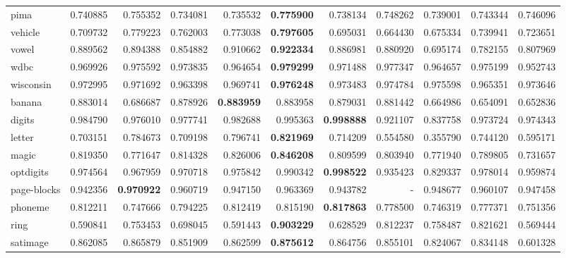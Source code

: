 \begin{tabular}{lrrrrrrrrrr}
pima            &   0.740885 &  0.755352 &  0.734081 &  0.735532 &  \textbf{0.775900} &  0.738134 &  0.748262 &  0.739001 &  0.743344 &  0.746096 \\
vehicle         &   0.709732 &  0.779223 &  0.762003 &  0.773038 &  \textbf{0.797605} &  0.695031 &  0.664430 &  0.675334 &  0.739941 &  0.723651 \\
vowel           &   0.889562 &  0.894388 &  0.854882 &  0.910662 &  \textbf{0.922334} &  0.886981 &  0.880920 &  0.695174 &  0.782155 &  0.807969 \\
wdbc            &   0.969926 &  0.975592 &  0.973835 &  0.964654 &  \textbf{0.979299} &  0.971488 &  0.977347 &  0.964657 &  0.975199 &  0.952743 \\
wisconsin       &   0.972995 &  0.971692 &  0.963398 &  0.969741 &  \textbf{0.976248} &  0.973483 &  0.974784 &  0.975598 &  0.965351 &  0.973646 \\
banana          &   0.883014 &  0.686687 &  0.878926 &  \textbf{0.883959} &  0.883958 &  0.879031 &  0.881442 &  0.664986 &  0.654091 &  0.652836 \\
digits          &   0.984790 &  0.976010 &  0.977741 &  0.982688 &  0.995363 &  \textbf{0.998888} &  0.921107 &  0.837758 &  0.973724 &  0.974343 \\
letter          &   0.703151 &  0.784673 &  0.709198 &  0.796741 &  \textbf{0.821969} &  0.714209 &  0.554580 &  0.355790 &  0.744120 &  0.595171 \\
magic           &   0.819350 &  0.771647 &  0.814328 &  0.826006 &  \textbf{0.846208} &  0.809599 &  0.803940 &  0.771940 &  0.789805 &  0.731657 \\
optdigits       &   0.974564 &  0.967959 &  0.970718 &  0.975842 &  0.990342 &  \textbf{0.998522} &  0.935423 &  0.829337 &  0.978014 &  0.959874 \\
page-blocks     &   0.942356 &  \textbf{0.970922} &  0.960719 &  0.947150 &  0.963369 &  0.943782 &       - &  0.948677 &  0.960107 &  0.947458 \\
phoneme         &   0.812211 &  0.747666 &  0.794225 &  0.812419 &  0.815190 &  \textbf{0.817863} &  0.778500 &  0.746319 &  0.777371 &  0.751356 \\
ring            &   0.590841 &  0.753453 &  0.698045 &  0.591443 &  \textbf{0.903229} &  0.628529 &  0.812237 &  0.758487 &  0.821621 &  0.569444 \\
satimage        &   0.862085 &  0.865879 &  0.851909 &  0.862599 &  \textbf{0.875612} &  0.864756 &  0.855101 &  0.824067 &  0.834148 &  0.601328 \\

\end{tabular}
